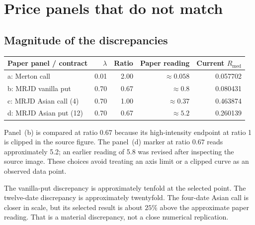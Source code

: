 \documentclass[11pt,a4paper]{article}
\begin{document}
\clearpage
\section{Price panels that do not match}
\subsection{Magnitude of the discrepancies}
\begin{center}\small
\begin{tabular}{@{}lrrrr@{}}
\toprule
Paper panel / contract & $\lambda$ & Ratio & Paper reading & Current $R_{\mathrm{med}}$\\
\midrule
a: Merton call & 0.01 & 2.00 & $\approx 0.058$ & 0.057702 \\
b: MRJD vanilla put & 0.70 & 0.67 & $\approx 0.8$ & 0.080431 \\
c: MRJD Asian call (4) & 0.70 & 1.00 & $\approx 0.37$ & 0.463874 \\
d: MRJD Asian put (12) & 0.70 & 0.67 & $\approx 5.2$ & 0.260139 \\
\bottomrule
\end{tabular}
\end{center}
Panel~(b) is compared at ratio $0.67$ because its high-intensity endpoint
at ratio 1 is clipped in the source figure. The panel~(d) marker at
ratio $0.67$ reads approximately 5.2; an earlier reading of 5.8 was
revised after inspecting the source image. These choices avoid treating
an axis limit or a clipped curve as an observed data point.

The vanilla-put discrepancy is approximately tenfold at the selected
point. The twelve-date discrepancy is approximately twentyfold. The
four-date Asian call is closer in scale, but its selected result is
about $25\%$ above the approximate paper reading. That is a material
discrepancy, not a close numerical replication.
\end{document}
